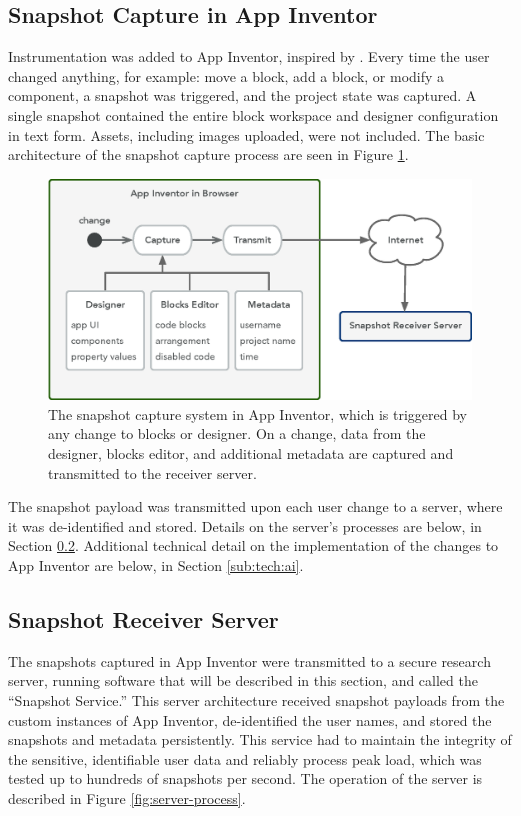 \subsection{Snapshot Capture in App Inventor}
\label{sec:mod-ai}
Instrumentation was added to App Inventor, inspired by \citet{piech-2012}. Every time the user changed anything, for example: move a block, add a block, or modify a component, a snapshot was triggered, and the project state was captured. A single snapshot contained the entire block workspace and designer configuration in text form. Assets, including images uploaded, were not included. The basic architecture of the snapshot capture process are seen in Figure \ref{fig:snapshot-arch}.

\begin{figure}
  \centering
      \includegraphics[width=\textwidth]{diagrams/architecture}
  \caption[Snapshot capture design diagram]{The snapshot capture system in App Inventor, which is triggered by any change to blocks or designer. On a change, data from the designer, blocks editor, and additional metadata are captured and transmitted to the receiver server.}
  \label{fig:snapshot-arch}
\end{figure}

The snapshot payload was transmitted upon each user change to a server, where it was de-identified and stored. Details on the server's processes are below, in Section \ref{sec:server}. Additional technical detail on the implementation of the changes to App Inventor are below, in Section \ref{sub:tech:ai}.

\subsection{Snapshot Receiver Server}
\label{sec:server}
The snapshots captured in App Inventor were transmitted to a secure research server, running software that will be described in this section, and called the ``Snapshot Service.'' This server architecture received snapshot payloads from the custom instances of App Inventor, de-identified the user names, and stored the snapshots and metadata persistently. This service had to maintain the integrity of the sensitive, identifiable user data and reliably process peak load, which was tested up to hundreds of snapshots per second. The operation of the server is described in Figure \ref{fig:server-process}.


